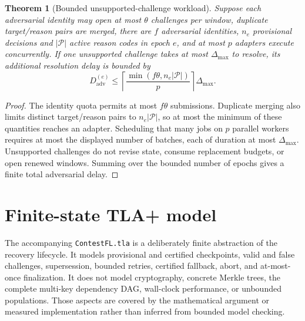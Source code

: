 \documentclass[10pt]{article}
\newtheorem{theorem}{Theorem}
\begin{document}
\begin{theorem}[Bounded unsupported-challenge workload]
Suppose each adversarial identity may open at most $\theta$ challenges per
window, duplicate target/reason pairs are merged, there are $f$ adversarial
identities, $n_e$ provisional decisions and $|\mathcal P|$ active reason codes
in epoch $e$, and at most $p$ adapters execute concurrently.  If one unsupported
challenge takes at most $\Delta_{\max}$ to resolve, its additional resolution
delay is bounded by
\[
D_{\mathrm{adv}}^{(e)}\le
\left\lceil\frac{\min(f\theta,n_e|\mathcal P|)}{p}\right\rceil
\Delta_{\max}.
\]
\end{theorem}
\begin{proof}
The identity quota permits at most $f\theta$ submissions.  Duplicate merging
also limits distinct target/reason pairs to $n_e|\mathcal P|$, so at most the
minimum of these quantities reaches an adapter.  Scheduling that many jobs on
$p$ parallel workers requires at most the displayed number of batches, each of
duration at most $\Delta_{\max}$.  Unsupported challenges do not revise state,
consume replacement budgets, or open renewed windows.  Summing over the bounded
number of epochs gives a finite total adversarial delay.
\end{proof}

\section{Finite-state TLA+ model}
The accompanying \texttt{ContestFL.tla} is a deliberately finite abstraction of
the recovery lifecycle.  It models provisional and certified checkpoints,
valid and false challenges, supersession, bounded retries, certified fallback,
abort, and at-most-once finalization.  It does not model cryptography, concrete
Merkle trees, the complete multi-key dependency DAG, wall-clock performance, or
unbounded populations.  Those aspects are covered by the mathematical argument
or measured implementation rather than inferred from bounded model checking.
\end{document}
